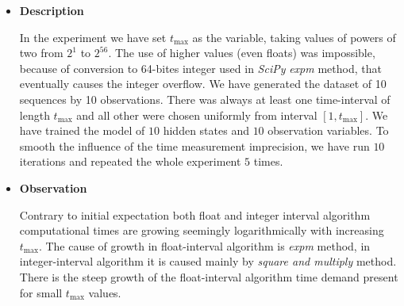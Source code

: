 \documentclass[thesis=M,english]{FITthesis}[2012/10/20]
\begin{document}
\begin{itemize}
\item \textbf{ Description }

In the experiment we have set $t_{\max}$ as the variable, taking values of powers of two from $2^1$ to $2^{56}$. The use of higher values (even floats) was impossible, because of conversion to 64-bites integer used in \textit{SciPy} \textit{expm} method, that eventually causes the integer overflow. We have generated the dataset of 10 sequences by 10 observations. There was always at least one time-interval of length $t_{\max}$ and all other were chosen uniformly from interval $[1,t_{\max}]$. We have trained the model of $10$ hidden states and $10$ observation variables. To smooth the influence of the time measurement imprecision, we have run $10$ iterations and repeated the whole experiment $5$ times.   

\item \textbf{ Observation }

Contrary to initial expectation both float and integer interval algorithm computational times are growing seemingly logarithmically with increasing $t_{\max}$. The cause of growth in float-interval algorithm is \textit{expm} method, in integer-interval algorithm it is caused mainly by \textit{square and multiply} method. There is the steep growth of the float-interval algorithm time demand present for small $t_{\max}$ values.


\end{itemize}
\end{document}
